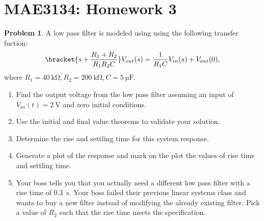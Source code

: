 \documentclass[10pt]{article}
\date{}
\theoremstyle{definition}
\newtheorem{prob}{Problem}[section]
\newenvironment{subprob}%
{\renewcommand{\theenumi}{\alph{enumi}}\renewcommand{\labelenumi}{(\theenumi)}\begin{enumerate}}%
{\end{enumerate}}%
\begin{document}
\pagestyle{empty}
\section*{MAE3134: Homework 3}
\vspace*{-0.4cm}

\begin{prob}
    A low pass filter is modeled using using the following transfer fuction:
    \begin{align}
        \bracket{s + \frac{R_1 + R_2}{R_1 R_2 C}} V_{out}(s) = \frac{1}{R_1 C} V_{in}(s) + V_{out}(0), 
    \end{align}
    where \( R_1 = \SI{40}{\kilo\ohm}, R_2 = \SI{200}{\kilo\ohm}, C = \SI{5}{\micro\farad}\).

    \begin{subprob}
        \item Find the output voltage from the low pass filter assuming an input of \( V_{in}(t) = \SI{2}{\volt}\) and zero initial conditions.
        \item Use the initial and final value theorems to validate your solution.
        \item Determine the rise and settling time for this system response.
        \item Generate a plot of the response and mark on the plot the values of rise time and settling time.
    \item Your boss tells you that you actually need a different low pass filter with a rise time of \SI{0.3}{\second}.
        Your boss failed their previous linear systems class and wants to buy a new filter instead of modifying the already existing filter.
        Pick a value of \( R_2\) such that the rise time meets the specification.
    \end{subprob}
\end{prob}
\end{document}
